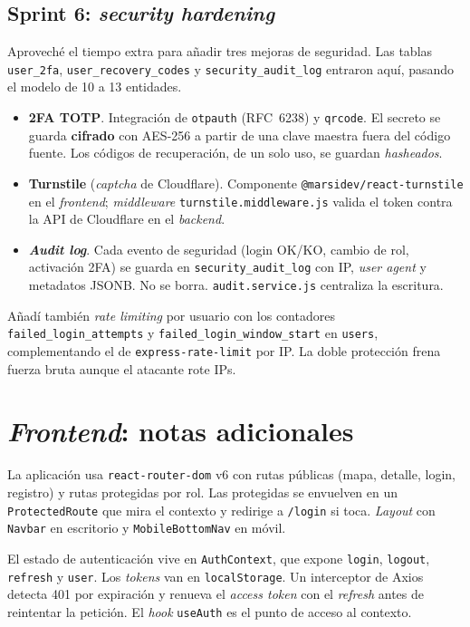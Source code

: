 \subsection{Sprint 6: \textit{security hardening}}

Aproveché el tiempo extra para añadir tres mejoras de seguridad. Las tablas \texttt{user\_2fa}, \texttt{user\_recovery\_codes} y \texttt{security\_audit\_log} entraron aquí, pasando el modelo de 10 a 13 entidades.

\begin{itemize}[leftmargin=1.2cm, itemsep=2pt]
  \item \textbf{2FA TOTP}. Integración de \texttt{otpauth} (RFC~6238) y \texttt{qrcode}. El secreto se guarda \textbf{cifrado} con AES-256 a partir de una clave maestra fuera del código fuente. Los códigos de recuperación, de un solo uso, se guardan \textit{hasheados}.
  \item \textbf{Turnstile} (\textit{captcha} de Cloudflare). Componente \texttt{@marsidev/react-turnstile} en el \textit{frontend}; \textit{middleware} \texttt{turnstile.middleware.js} valida el token contra la API de Cloudflare en el \textit{backend}.
  \item \textbf{\textit{Audit log}}. Cada evento de seguridad (login OK/KO, cambio de rol, activación 2FA) se guarda en \texttt{security\_audit\_log} con IP, \textit{user agent} y metadatos JSONB. No se borra. \texttt{audit.service.js} centraliza la escritura.
\end{itemize}

Añadí también \textit{rate limiting} por usuario con los contadores \texttt{failed\_login\_attempts} y \texttt{failed\_login\_window\_start} en \texttt{users}, complementando el de \texttt{express-rate-limit} por IP. La doble protección frena fuerza bruta aunque el atacante rote IPs.


\section{\textit{Frontend}: notas adicionales}
\label{sec:frontend-destacados}

La aplicación usa \texttt{react-router-dom} v6 con rutas públicas (mapa, detalle, login, registro) y rutas protegidas por rol. Las protegidas se envuelven en un \texttt{ProtectedRoute} que mira el contexto y redirige a \texttt{/login} si toca. \textit{Layout} con \texttt{Navbar} en escritorio y \texttt{MobileBottomNav} en móvil.

El estado de autenticación vive en \texttt{AuthContext}, que expone \texttt{login}, \texttt{logout}, \texttt{refresh} y \texttt{user}. Los \textit{tokens} van en \texttt{localStorage}. Un interceptor de Axios detecta 401 por expiración y renueva el \textit{access token} con el \textit{refresh} antes de reintentar la petición. El \textit{hook} \texttt{useAuth} es el punto de acceso al contexto.


